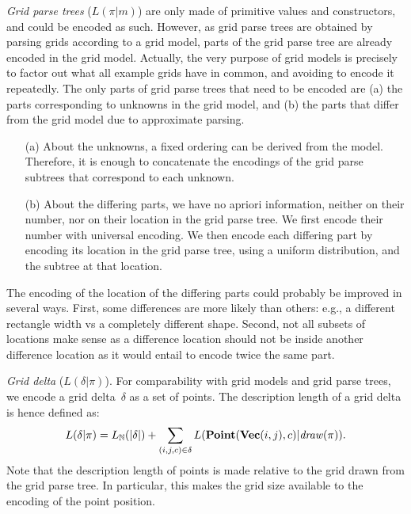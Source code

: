 \documentclass[a4paper]{llncs}
\newcommand{\nat}{\mathbb{N}}
\begin{document}
{\em Grid parse trees} ($L(\pi|m)$) are only made of primitive values
and constructors, and could be encoded as such. However, as grid parse
trees are obtained by parsing grids according to a grid model, parts
of the grid parse tree are already encoded in the grid
model. Actually, the very purpose of grid models is precisely to
factor out what all example grids have in common, and avoiding to
encode it repeatedly. The only parts of grid parse trees that need to
be encoded are (a) the parts corresponding to unknowns in the grid
model, and (b) the parts that differ from the grid model due to
approximate parsing.
\begin{itemize}
\item[(a)] About the unknowns, a fixed ordering can be derived from
  the model. Therefore, it is enough to concatenate the encodings of
  the grid parse subtrees that correspond to each unknown.
\item[(b)] About the differing parts, we have no apriori information,
  neither on their number, nor on their location in the grid parse
  tree. We first encode their number with universal encoding. We then
  encode each differing part by encoding its location in the grid
  parse tree, using a uniform distribution, and the subtree at that
  location.
\end{itemize}
The encoding of the location of the differing parts could probably be
improved in several ways. First, some differences are more likely than
others: e.g., a different rectangle width vs a completely different
shape. Second, not all subsets of locations make sense as a difference
location should not be inside another difference location as it would
entail to encode twice the same part.

{\em Grid delta} ($L(\delta|\pi)$). For comparability with grid models and grid parse
trees, we encode a grid delta~$\delta$ as a set of points.  The
description length of a grid delta is hence defined as:
\[ L(\delta|\pi) = L_\nat(|\delta|) + \sum_{(i,j,c) \in \delta} L({\bf Point}({\bf Vec}(i,j),c)|{\it draw}(\pi)). \]
%
Note that the description length of points is made relative to the
grid drawn from the grid parse tree. In particular, this makes the
grid size available to the encoding of the point position.
\end{document}
